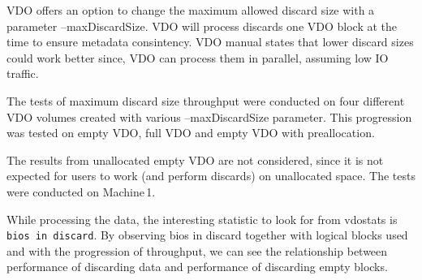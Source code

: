 \documentclass[
  color, %
  table, %
  lof,   %
  lot,   %
]{fithesis3}
\begin{document}
VDO offers an option to change the maximum allowed discard size with a parameter --maxDiscardSize. VDO will process discards one VDO block at the time to ensure metadata consintency. VDO manual states that lower discard sizes could work better since, VDO can process them in parallel, assuming low IO traffic.

The tests of maximum discard size throughput were conducted on four different VDO volumes created with various --maxDiscardSize parameter. This progression was tested on empty VDO, full VDO and empty VDO with preallocation.

The results from unallocated empty VDO are not considered, since it is not expected for users to work (and perform discards) on unallocated space. The tests were conducted on Machine\,1.

While processing the data, the interesting statistic to look for from vdostats is \texttt{bios in discard}. By observing bios in discard together with logical blocks used and with the progression of throughput, we can see the relationship between performance of discarding data and performance of discarding empty blocks.
\end{document}
